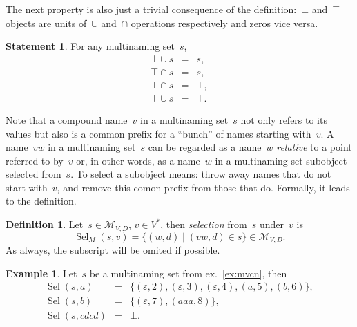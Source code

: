 \documentclass{article}
\theoremstyle{definition}
\newtheorem{Df}{Definition}
\newtheorem{St}{Statement}
\newtheorem{Ex}{Example}
\newcommand{\setcharmvcn}{M}
\newcommand{\setsymbol}[3]{\mathcal{#1}_{#2,#3}}
\newcommand{\setmvcn}[2]{\setsymbol{\setcharmvcn}{#1}{#2}}
\newcommand{\select}{\operatorname{Sel}}
\begin{document}
The next property is also just a trivial consequence of the definition:~$\bot$
and~$\top$ objects are units of~$\cup$ and~$\cap$ operations respectively and
zeros vice versa.
\begin{St}\label{st:mvcn-neutrals}
For any multinaming set~$s$,
\begin{eqnarray*}
  \bot \cup s & = & s,    \\
  \top \cap s & = & s,    \\
  \bot \cap s & = & \bot, \\
  \top \cup s & = & \top.
\end{eqnarray*}
\end{St}

Note that a compound name~$v$ in a multinaming set~$s$ not only refers to its
values but also is a common prefix for a ``bunch'' of names starting with~$v$.
A name~$vw$ in a multinaming set~$s$ can be regarded as a name~$w$
\emph{relative} to a point referred to by~$v$ or, in other words, as a name~$w$
in a multinaming set subobject selected from~$s$. To select a subobject means:
throw away names that do not start with~$v$, and remove this comon prefix from
those that do. Formally, it leads to the definition.

\begin{Df}\label{df:mvcn-select}
Let~$s\in\setmvcn{V}{D}$, $v\in V^\ast$, then \emph{selection} from~$s$
under~$v$ is
\[
  \select_\setcharmvcn(s,v) = \{ (w, d) \mid (vw, d)\in s \} \in\setmvcn{V}{D}.
\]
As always, the subscript will be omited if possible.
\end{Df}

\begin{Ex}\label{ex:mvcn-select}
Let~$s$ be a multinaming set from ex.~\ref{ex:mvcn}, then
\begin{eqnarray*}
  \select(s, a) & = & \{
    (\varepsilon, 2),
    (\varepsilon, 3),
    (\varepsilon, 4),
    (a,           5),
    (b,           6)
  \} , \\
  \select(s, b) & = & \{
    (\varepsilon, 7),
    (aaa,         8)
  \} , \\
  \select(s, cdcd) & = & \bot .
\end{eqnarray*}
\end{Ex}
\end{document}
